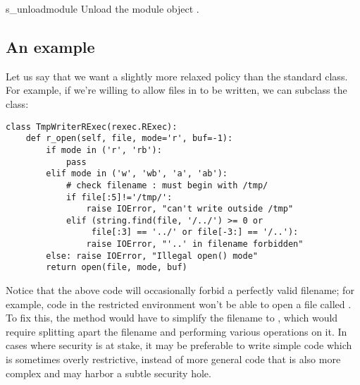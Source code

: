 \begin{methoddesc}{s_unload}{module}
Unload the module object .   
\end{methoddesc}

\subsection{An example}

Let us say that we want a slightly more relaxed policy than the
standard  class.  For example, if we're willing to allow
files in  to be written, we can subclass the 
class:

\begin{verbatim}
class TmpWriterRExec(rexec.RExec):
    def r_open(self, file, mode='r', buf=-1):
        if mode in ('r', 'rb'):
            pass
        elif mode in ('w', 'wb', 'a', 'ab'):
            # check filename : must begin with /tmp/
            if file[:5]!='/tmp/': 
                raise IOError, "can't write outside /tmp"
            elif (string.find(file, '/../') >= 0 or
                 file[:3] == '../' or file[-3:] == '/..'):
                raise IOError, "'..' in filename forbidden"
        else: raise IOError, "Illegal open() mode"
        return open(file, mode, buf)
\end{verbatim}
%
Notice that the above code will occasionally forbid a perfectly valid
filename; for example, code in the restricted environment won't be
able to open a file called .  To fix this, the
 method would have to simplify the filename to
, which would require splitting apart the filename and
performing various operations on it.  In cases where security is at
stake, it may be preferable to write simple code which is sometimes
overly restrictive, instead of more general code that is also more
complex and may harbor a subtle security hole.
